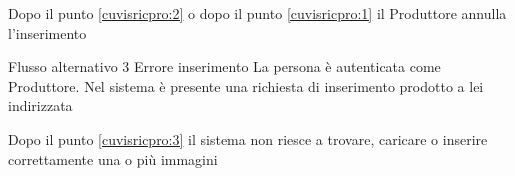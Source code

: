 {\begin{enumCU}
		\item Dopo il punto \ref{cuvisricpro:2} o dopo il punto \ref{cuvisricpro:1} il Produttore annulla l'inserimento
	\end{enumCU}}%
%
{Flusso alternativo 3}%
{Errore inserimento}%
{La persona è autenticata come Produttore. Nel sistema è presente una richiesta di inserimento prodotto a lei indirizzata}
{\postNulle}%
{\begin{enumCU}
		\item Dopo il punto \ref{cuvisricpro:3} il sistema non riesce a trovare, caricare o inserire correttamente una o più immagini
	\end{enumCU}}%

\tabcuvspace

